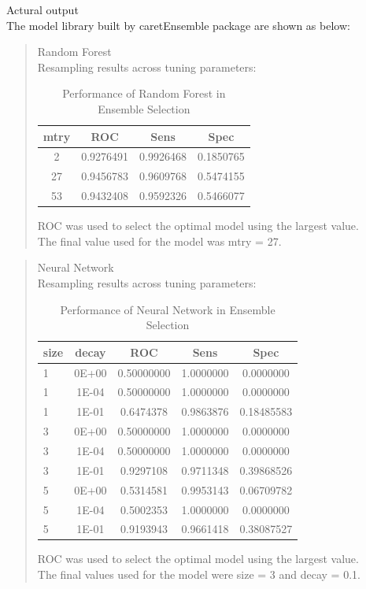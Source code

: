 \documentclass[12pt, a4paper, bibliography=totoc, english]{scrartcl}
\begin{document}
\textbullet\quad Actural output \\
The model library built by caretEnsemble package are shown as below:
\begin{quote} 
	Random Forest\\ 
	Resampling results across tuning parameters:
	
	\begin{table}[htbp]
		\centering
		\begin{tabular}{|c|c|c|c|}\hline
			mtry & ROC & Sens & Spec\\\hline\hline
			2 & 0.9276491 & 0.9926468 & 0.1850765\\\hline
			27 & 0.9456783 & 0.9609768 & 0.5474155\\\hline
			53 & 0.9432408 & 0.9592326 & 0.5466077\\\hline
			
		\end{tabular}
		\caption{Performance of Random Forest in Ensemble Selection}
	\end{table}
	
	ROC was used to select the optimal model using the largest value.\\
	The final value used for the model was mtry = 27.
\end{quote}
\begin{quote} 
	Neural Network \\
	Resampling results across tuning parameters:
	\begin{table}[htbp]
		\centering
		\begin{tabular}{|l|c|c|c|c|}\hline
			\bfseries size &\bfseries decay &\bfseries ROC &\bfseries Sens &\bfseries Spec\\\hline\hline
			1 & 0E+00 & 0.50000000 & 1.0000000 & 0.0000000\\\hline
			1 & 1E-04 & 0.50000000 & 1.0000000 & 0.0000000\\\hline
			1 & 1E-01 & 0.6474378 & 0.9863876 & 0.18485583\\\hline
			3 & 0E+00 & 0.50000000 & 1.0000000 & 0.0000000\\\hline
			3 & 1E-04 & 0.50000000 & 1.0000000 & 0.0000000\\\hline
			3 & 1E-01 & 0.9297108 & 0.9711348 & 0.39868526\\\hline
			5 & 0E+00 & 0.5314581 & 0.9953143 & 0.06709782\\\hline
			5 & 1E-04 & 0.5002353 & 1.0000000 & 0.0000000\\\hline
			5 & 1E-01 & 0.9193943 & 0.9661418 & 0.38087527\\\hline
			
		\end{tabular}
		\caption{Performance of Neural Network in Ensemble Selection}
	\end{table}
	ROC was used to select the optimal model using the largest value.\\
	The final values used for the model were size = 3 and decay = 0.1.
	
\end{quote}
\end{document}
